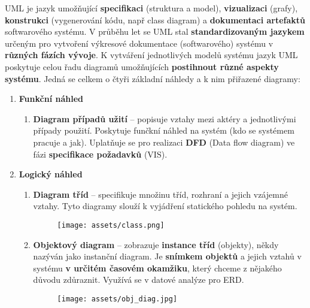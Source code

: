 UML je jazyk umožňující \textbf{specifikaci} (struktura a model), \textbf{vizualizaci} (grafy), \textbf{konstrukci} (vygenerování kódu, např class diagram) a \textbf{dokumentaci artefaktů} softwarového systému. V průběhu let se UML stal \textbf{standardizovaným jazykem }určeným pro vytvoření výkresové dokumentace (softwarového) systému v \textbf{různých fázích vývoje}. K vytváření jednotlivých modelů systému jazyk UML poskytuje celou řadu diagramů umožňujících \textbf{postihnout různé aspekty systému}. Jedná se celkem o čtyři základní náhledy a k nim přiřazené diagramy: 

\begin{enumerate}
\item \textbf{Funkční náhled}
\begin{enumerate}
\item \textbf{Diagram případů užití} -- popisuje vztahy mezi aktéry a jednotlivými případy použití. Poskytuje funčkní náhled na systém (kdo se systémem pracuje a jak). Uplatňuje se pro realizaci \textbf{DFD} (Data flow diagram) ve fázi \textbf{specifikace požadavků} (VIS).
\end{enumerate}
\item \textbf{Logický náhled}
\begin{enumerate}
\item \textbf{Diagram tříd} -- specifikuje množinu tříd, rozhraní a jejich vzájemné vztahy. Tyto diagramy slouží k vyjádření statického pohledu na systém.
\begin{figure}[H]
	\centering
	\texttt{[image: assets/class.png]}
\end{figure}
\item \textbf{Objektový diagram} -- zobrazuje \textbf{instance tříd} (objekty), někdy nazýván jako instanční diagram.
Je \textbf{snímkem objektů} a jejich vztahů v systému \textbf{v určitém časovém okamžiku}, který chceme z nějakého důvodu zdůraznit. Využívá se v datové analýze pro ERD.
\begin{figure}[H]
	\centering
	\texttt{[image: assets/obj\_diag.jpg]}
\end{figure}
\end{enumerate}


\end{enumerate}
